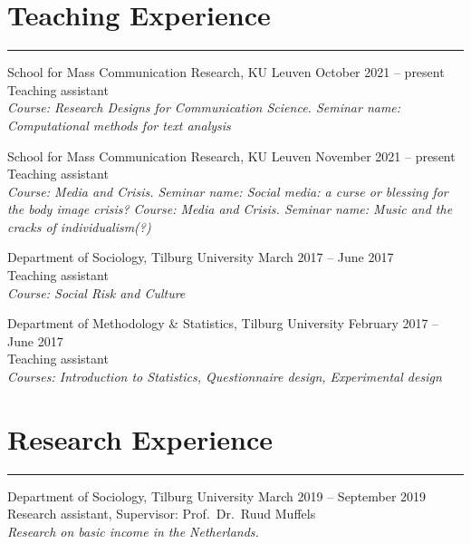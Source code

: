 \documentclass[12pt,]{article}
\begin{document}
\hypertarget{teaching-experience}{%
\section{Teaching Experience}\label{teaching-experience}}

\vspace{-10pt}
\rule{1\linewidth}{\linethickness}

School for Mass Communication Research, KU Leuven
\hfill \begingroup\small October 2021 -- present\endgroup\\
Teaching assistant\\
\emph{Course: Research Designs for Communication Science. Seminar name:
Computational methods for text analysis}

School for Mass Communication Research, KU Leuven
\hfill \begingroup\small November 2021 -- present\endgroup\\
Teaching assistant\\
\emph{Course: Media and Crisis. Seminar name: Social media: a curse or
blessing for the body image crisis?} \emph{Course: Media and Crisis.
Seminar name: Music and the cracks of individualism(?)}

Department of Sociology, Tilburg University
\hfill \begingroup\small March 2017 -- June 2017\endgroup\\
Teaching assistant\\
\emph{Course: Social Risk and Culture}

Department of Methodology \& Statistics, Tilburg University
\hfill \begingroup\small February 2017 -- June 2017\endgroup\\
Teaching assistant\\
\emph{Courses: Introduction to Statistics, Questionnaire design,
Experimental design}

\hypertarget{research-experience}{%
\section{Research Experience}\label{research-experience}}

\vspace{-10pt}
\rule{1\linewidth}{\linethickness}

Department of Sociology, Tilburg University
\hfill \begingroup\small March 2019 -- September 2019\endgroup\\
Research assistant, Supervisor: Prof.~Dr.~Ruud Muffels\\
\emph{Research on basic income in the Netherlands.}
\end{document}
